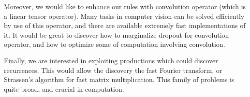 Moreover, we would like to enhance our rules with convolution operator (which is
a linear tensor operator). Many tasks in computer vision can be solved efficiently
by use of this operator, and there are available extremely fast implementations of it.
It would be great to discover how to marginalize dropout for convolution operator, 
and how to optimize some of computation involving convolution.


Finally, we are interested in exploiting productions which could discover 
recurrences. This would allow the discovery the fast Fourier transform, or
Strassen's algorithm for fast matrix multiplication. This family of problems is quite broad,
and crucial in computation.


